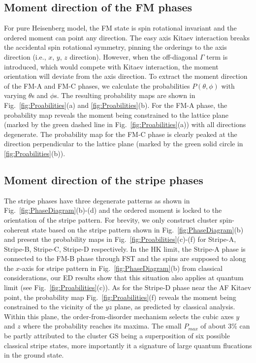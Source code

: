 \documentclass[aps,prb,reprint,amsfonts,amsmath,amssymb,showpacs,groupedaddress,superscriptaddress]{revtex4-1}
\begin{document}
\subsection{\label{sec:SectionVA}Moment direction of the FM phases}
For pure Heisenberg model, the FM state is spin rotational invariant and the ordered moment can point any direction. The easy axis Kitaev interaction breaks the accidental spin rotational symmetry, pinning the orderings to the axis direction (i.e., $x$, $y$, $z$ direction). However, when the off-diagonal $\Gamma$ term is introduced, which would compete with Kitaev interaction, the moment orientation will deviate from the axis direction. To extract the moment direction of the FM-A and FM-C phases, we calculate the probabilities $P(\theta, \phi)$ with varying $\theta$s and $\phi$s. The resulting probability maps are shown in Fig.~\ref{fig:Proabilities}(a) and \ref{fig:Proabilities}(b). For the FM-A phase, the probability map reveals the moment being constrained to the lattice plane (marked by the green dashed line in Fig.~\ref{fig:Proabilities}(a)) with all directions degenerate. The probability map for the FM-C phase is clearly peaked at the direction perpendicular to the lattice plane (marked by the green solid circle in \ref{fig:Proabilities}(b)).

\subsection{\label{sec:SectionVB}Moment direction of the stripe phases}
The stripe phases have three degenerate patterns as shown in Fig.~\ref{fig:PhaseDiagram}(b)-(d) and the ordered moment is locked to the orientation of the stripe pattern. For brevity, we only construct cluster spin-coherent state based on the stripe pattern shown in Fig.~\ref{fig:PhaseDiagram}(b) and present the probability maps in Fig.~\ref{fig:Proabilities}(c)-(f) for Stripe-A, Stripe-B, Stripe-C, Stripe-D respectively. In the HK limit, the Stripe-A phase is connected to the FM-B phase through FST and the spins are supposed to along the $x$-axis for stripe pattern in Fig.~\ref{fig:PhaseDiagram}(b) from classical considerations, our ED results show that this situation also applies at quantum limit (see Fig.~\ref{fig:Proabilities}(c)). As for the Stripe-D phase near the AF Kitaev point, the probability map Fig.~\ref{fig:Proabilities}(f) reveals the moment being constrained to the vicinity of the $yz$ plane, as predicted by classical analysis. Within this plane, the order-from-disorder mechanism selects the cubic axes $y$ and $z$ where the probability reaches its maxima. The small $P_{max}$ of about 3\% can be partly attributed to the cluster GS being a superposition of six possible classical stripe states, more importantly it a signature of large quantum flucations in the ground state.
\end{document}
